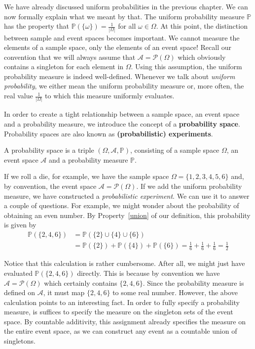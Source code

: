 We have already discussed uniform probabilities in the previous chapter. We can now formally explain
what we meant by that. The uniform probability measure $ \mathbb{P} $ has the property that
$ \mathbb{P}(\{\omega\}) = \frac{1}{|\Omega|} $ for all $ \omega \in \Omega $. At this point, the
distinction between sample and event spaces becomes important. We cannot measure the elements of a
sample space, only the elements of an event space! Recall our convention that we will always assume
that $ \mathcal{A} = \mathcal{P}(\Omega) $ which obviously contains a singleton for each element in
$ \Omega $. Using this assumption, the uniform probability measure is indeed well-defined. Whenever we talk about
\textit{uniform probability}, we either mean the uniform probability measure or, more often, the real
value $ \frac{1}{|\Omega|} $ to which this measure uniformly evaluates.

In order to create a tight relationship between a sample space, an event space and a probability measure,
we introduce the concept of a \textbf{probability space}. Probability spaces are also known as 
\textbf{(probabilistic) experiments}.

\begin{Definition} \label{def:ProbabilitySpace}
A probability space is a triple $ (\Omega, \mathcal{A}, \mathbb{P}) $, consisting of a sample space $ \Omega $,
an event space $ \mathcal{A} $ and a probability measure $ \mathbb{P} $.
\end{Definition}

If we roll a die, for example, we have the sample space $ \Omega = \{1,2,3,4,5,6\} $ and, by 
convention, the event space $ \mathcal{A} = \mathcal{P}(\Omega) $. If we add the uniform probability measure, 
we have constructed  a \emph{probabilistic experiment}. We can use it to answer a couple of questions. For example, we 
might wonder about the probability of obtaining an even number. By Property~\ref{union} of our definition, this 
probability is given by
\begin{align}
\mathbb{P}(\{2,4,6\}) &= \mathbb{P}(\{2\} \cup \{4\} \cup \{6\}) \\
&= \mathbb{P}(\{2\}) + \mathbb{P}(\{4\})
+ \mathbb{P}(\{6\}) = \frac{1}{6} + \frac{1}{6} + \frac{1}{6} = \frac{1}{2}
\end{align}

Notice that this calculation is rather cumbersome. After all, we might just have evaluated 
$ \mathbb{P}(\{2,4,6\}) $ directly. This is because by convention we have $ \mathcal{A} = \mathcal{P}(\Omega) $ which certainly contains $ \{2,4,6\} $.
Since the probability measure is defined on $ \mathcal{A} $, it must map $ \{2,4,6\} $ to some real number.
However, the above calculation points to an interesting fact. In order
to fully specify a probability measure, is suffices to specify the measure on the singleton sets of the
event space. By countable additivity, this assignment already specifies the measure on the entire event space, as we can
construct any event as a countable union of singletons.


